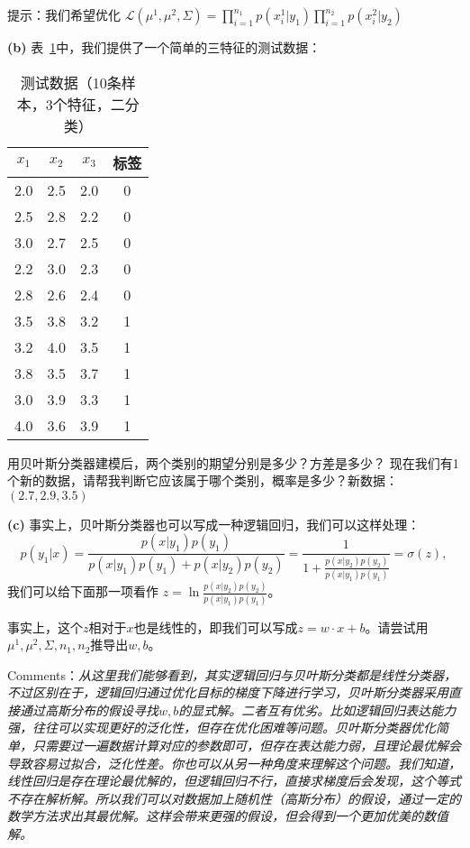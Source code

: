 \documentclass{article}
\begin{document}
提示：我们希望优化 $\mathcal{L}(\mu^1, \mu^2, \Sigma) = \prod_{i=1}^{n_1} p(x_i^1|y_1) \prod_{i=1}^{n_2} p(x_i^2|y_2)$ 

\noindent \textbf{(b)}
表~\ref{table:testdata}中，我们提供了一个简单的三特征的测试数据：
\begin{table}[!h]
    \centering
    \begin{tabular}{cccc}
        \hline
        \( x_1 \) & \( x_2 \) & \( x_3 \) & 标签 \\
        \hline
        2.0 & 2.5 & 2.0 & 0 \\
        2.5 & 2.8 & 2.2 & 0 \\
        3.0 & 2.7 & 2.5 & 0 \\
        2.2 & 3.0 & 2.3 & 0 \\
        2.8 & 2.6 & 2.4 & 0 \\
        3.5 & 3.8 & 3.2 & 1 \\
        3.2 & 4.0 & 3.5 & 1 \\
        3.8 & 3.5 & 3.7 & 1 \\
        3.0 & 3.9 & 3.3 & 1 \\
        4.0 & 3.6 & 3.9 & 1 \\
        \hline
    \end{tabular}
    \caption{测试数据（10条样本，3个特征，二分类）}
    \label{table:testdata}
\end{table}

用贝叶斯分类器建模后，两个类别的期望分别是多少？方差是多少？
现在我们有1个新的数据，请帮我判断它应该属于哪个类别，概率是多少？新数据：$(2.7, 2.9, 3.5)$

\noindent \textbf{(c)}
事实上，贝叶斯分类器也可以写成一种逻辑回归，我们可以这样处理：
\begin{equation}
    p(y_1 | x) = \frac{p(x|y_1) p (y_1)}{p(x|y_1)p(y_1) + p(x|y_2)p(y_2)} = \frac{1}{1 + \frac{p(x|y_2)p(y_2)}{p(x|y_1)p(y_1)}} = \sigma(z),
\end{equation}
我们可以给下面那一项看作 $z = \ln\frac{p(x|y_2)p(y_2)}{p(x|y_1)p(y_1)}$。

事实上，这个$z$相对于$x$也是线性的，即我们可以写成$z = w \cdot x + b$。请尝试用$\mu^1, \mu^2, \Sigma, n_1, n_2$推导出$w, b$。

Comments：\textit{从这里我们能够看到，其实逻辑回归与贝叶斯分类都是线性分类器，不过区别在于，逻辑回归通过优化目标的梯度下降进行学习，贝叶斯分类器采用直接通过高斯分布的假设寻找$w, b$的显式解。二者互有优劣。比如逻辑回归表达能力强，往往可以实现更好的泛化性，但存在优化困难等问题。贝叶斯分类器优化简单，只需要过一遍数据计算对应的参数即可，但存在表达能力弱，且理论最优解会导致容易过拟合，泛化性差。你也可以从另一种角度来理解这个问题。我们知道，线性回归是存在理论最优解的，但逻辑回归不行，直接求梯度后会发现，这个等式不存在解析解。所以我们可以对数据加上随机性（高斯分布）的假设，通过一定的数学方法求出其最优解。这样会带来更强的假设，但会得到一个更加优美的数值解。}
\end{document}
